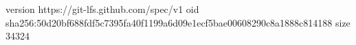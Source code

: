 version https://git-lfs.github.com/spec/v1
oid sha256:50d20bf688fdf5c7395fa40f1199a6d09e1ecf5bae00608290c8a1888c814188
size 34324

